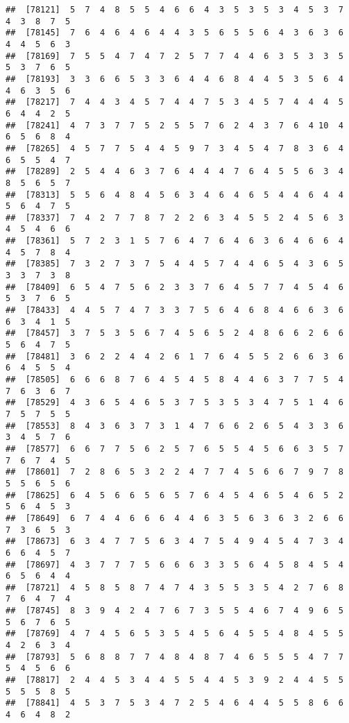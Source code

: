 \documentclass[
]{book}
\begin{document}
\begin{verbatim}
##  [78121]  5  7  4  8  5  5  4  6  6  4  3  5  3  5  3  4  5  3  7  4  3  8  7  5
##  [78145]  7  6  4  6  4  6  4  4  3  5  6  5  5  6  4  3  6  3  6  4  4  5  6  3
##  [78169]  7  5  5  4  7  4  7  2  5  7  7  4  4  6  3  5  3  3  5  5  3  7  6  5
##  [78193]  3  3  6  6  5  3  3  6  4  4  6  8  4  4  5  3  5  6  4  4  6  3  5  6
##  [78217]  7  4  4  3  4  5  7  4  4  7  5  3  4  5  7  4  4  4  5  6  4  4  2  5
##  [78241]  4  7  3  7  7  5  2  5  5  7  6  2  4  3  7  6  4 10  4  6  5  6  8  4
##  [78265]  4  5  7  7  5  4  4  5  9  7  3  4  5  4  7  8  3  6  4  6  5  5  4  7
##  [78289]  2  5  4  4  6  3  7  6  4  4  4  7  6  4  5  5  6  3  4  8  5  6  5  7
##  [78313]  5  5  6  4  8  4  5  6  3  4  6  4  6  5  4  4  6  4  4  5  6  4  7  5
##  [78337]  7  4  2  7  7  8  7  2  2  6  3  4  5  5  2  4  5  6  3  4  5  4  6  6
##  [78361]  5  7  2  3  1  5  7  6  4  7  6  4  6  3  6  4  6  6  4  4  5  7  8  4
##  [78385]  7  3  2  7  3  7  5  4  4  5  7  4  4  6  5  4  3  6  5  3  3  7  3  8
##  [78409]  6  5  4  7  5  6  2  3  3  7  6  4  5  7  7  4  5  4  6  5  3  7  6  5
##  [78433]  4  4  5  7  4  7  3  3  7  5  6  4  6  8  4  6  6  3  6  6  3  4  1  5
##  [78457]  3  7  5  3  5  6  7  4  5  6  5  2  4  8  6  6  2  6  6  5  6  4  7  5
##  [78481]  3  6  2  2  4  4  2  6  1  7  6  4  5  5  2  6  6  3  6  6  4  5  5  4
##  [78505]  6  6  6  8  7  6  4  5  4  5  8  4  4  6  3  7  7  5  4  7  6  3  6  7
##  [78529]  4  3  6  5  4  6  5  3  7  5  3  5  3  4  7  5  1  4  6  7  5  7  5  5
##  [78553]  8  4  3  6  3  7  3  1  4  7  6  6  2  6  5  4  3  3  6  3  4  5  7  6
##  [78577]  6  6  7  7  5  6  2  5  7  6  5  5  4  5  6  6  3  5  7  7  6  7  4  5
##  [78601]  7  2  8  6  5  3  2  2  4  7  7  4  5  6  6  7  9  7  8  5  5  6  5  6
##  [78625]  6  4  5  6  6  5  6  5  7  6  4  5  4  6  5  4  6  5  2  5  6  4  5  3
##  [78649]  6  7  4  4  6  6  6  4  4  6  3  5  6  3  6  3  2  6  6  7  3  6  5  3
##  [78673]  6  3  4  7  7  5  6  3  4  7  5  4  9  4  5  4  7  3  4  6  6  4  5  7
##  [78697]  4  3  7  7  7  5  6  6  6  3  3  5  6  4  5  8  4  5  4  6  5  6  4  4
##  [78721]  4  5  8  5  8  7  4  7  4  3  5  5  3  5  4  2  7  6  8  7  6  4  7  4
##  [78745]  8  3  9  4  2  4  7  6  7  3  5  5  4  6  7  4  9  6  5  5  6  7  6  5
##  [78769]  4  7  4  5  6  5  3  5  4  5  6  4  5  5  4  8  4  5  5  4  2  6  3  4
##  [78793]  5  6  8  8  7  7  4  8  4  8  7  4  6  5  5  5  4  7  7  5  4  5  6  6
##  [78817]  2  4  4  5  3  4  4  5  5  4  4  5  3  9  2  4  4  5  5  5  5  5  8  5
##  [78841]  4  5  3  7  5  3  4  7  2  5  4  6  4  4  5  5  8  6  6  4  6  4  8  2

\end{verbatim}
\end{document}

